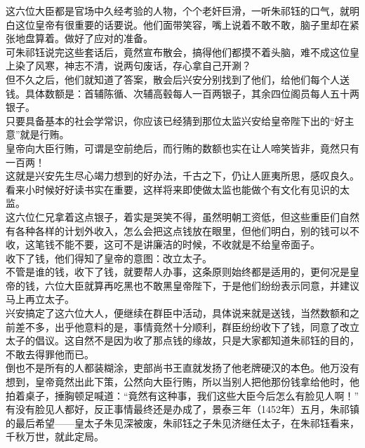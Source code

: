 \begin{multicols}{\theparacolNo}
这六位大臣都是官场中久经考验的人物，个个老奸巨滑，一听朱祁钰的口气，就明白这位皇帝有很重要的话要说。他们面带笑容，嘴上说着不敢不敢，脑子里却在紧张地盘算着。做好了应对的准备。\\

可朱祁钰说完这些套话后，竟然宣布散会，搞得他们都摸不着头脑，难不成这位皇上染了风寒，神志不清，说两句废话，存心拿自己开涮？\\

但不久之后，他们就知道了答案，散会后兴安分别找到了他们，给他们每个人送钱。具体数额是：首辅陈循、次辅高毂每人一百两银子，其余四位阁员每人五十两银子。\\

只要具备基本的社会学常识，你应该已经猜到那位太监兴安给皇帝陛下出的“好主意”就是行贿。\\

皇帝向大臣行贿，可谓是空前绝后，而行贿的数额也实在让人啼笑皆非，竟然只有一百两！\\

这就是兴安先生尽心竭力想到的好办法，千古之下，仍让人匪夷所思，感叹良久。看来小时候好好读书实在重要，这样将来即使做太监也能做个有文化有见识的太监。\\

这六位仁兄拿着这点银子，着实是哭笑不得，虽然明朝工资低，但这些重臣们自然有各种各样的计划外收入，怎么会把这点钱放在眼里，但他们明白，别的钱可以不收，这笔钱不能不要，这可不是讲廉洁的时候，不收就是不给皇帝面子。\\

收下了钱，他们得知了皇帝的意图：改立太子。\\

不管是谁的钱，收下了钱，就要帮人办事，这条原则始终都是适用的，更何况是皇帝的钱，六位大臣就算再吃黑也不敢黑皇帝陛下，于是他们纷纷表示同意，并建议马上再立太子。\\

兴安搞定了这六位大人，便继续在群臣中活动，具体说来就是送钱，当然数额和之前差不多，出乎他意料的是，事情竟然十分顺利，群臣纷纷收下了钱，同意了改立太子的倡议。这自然不是因为收了那点钱的缘故，只是大家都知道朱祁钰的目的，不敢去得罪他而已。\\

倒也不是所有的人都装糊涂，吏部尚书王直就发扬了他老牌硬汉的本色。他万没有想到，皇帝竟然出此下策，公然向大臣行贿，所以当别人把他那份钱拿给他时，他拍着桌子，捶胸顿足喊道：“竟然有这种事，我们这些大臣今后怎么有脸见人啊！”\\

有没有脸见人都好，反正事情最终还是办成了，景泰三年（1452年）五月，朱祁镇的最后希望——皇太子朱见深被废，朱祁钰之子朱见济继任太子，在朱祁钰看来，千秋万世，就此定局。\\


\end{multicols}
